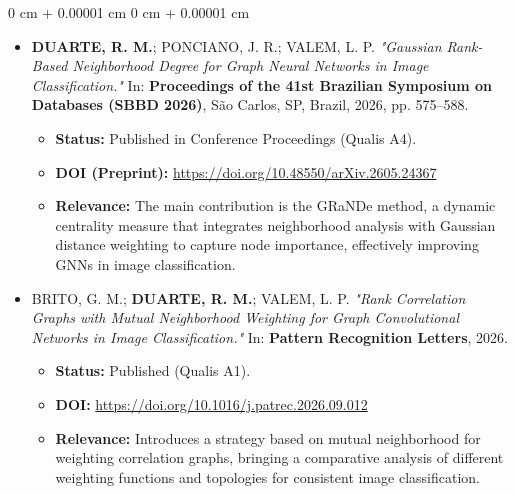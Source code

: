 \documentclass[10pt, letterpaper]{article}
\newenvironment{highlightsforbulletentries}{
    \begin{itemize}[
        topsep=0.10 cm,
        parsep=0.10 cm,
        partopsep=0pt,
        itemsep=0pt,
        leftmargin=10pt
    ]
}{
    \end{itemize}
} %
\newenvironment{onecolentry}{
    \begin{adjustwidth}{
        0 cm + 0.00001 cm
    }{
        0 cm + 0.00001 cm
    }
}{
    \end{adjustwidth}
} %
\begin{document}
\begin{onecolentry}
    \begin{highlightsforbulletentries}
    \item \textbf{DUARTE, R. M.}; PONCIANO, J. R.; VALEM, L. P. \textit{"Gaussian Rank-Based Neighborhood Degree for Graph Neural Networks in Image Classification."} In: \textbf{Proceedings of the 41st Brazilian Symposium on Databases (SBBD 2026)}, São Carlos, SP, Brazil, 2026, pp. 575--588.
    \begin{itemize}[topsep=0.05cm, parsep=0.05cm, leftmargin=0.5cm, label={--}]
        \item \textbf{Status:} Published in Conference Proceedings (Qualis A4).
        \item \textbf{DOI (Preprint):} \url{https://doi.org/10.48550/arXiv.2605.24367}
        \item \textbf{Relevance:} The main contribution is the GRaNDe method, a dynamic centrality measure that integrates neighborhood analysis with Gaussian distance weighting to capture node importance, effectively improving GNNs in image classification.
    \end{itemize}

    \vspace{0.15cm}

    \item BRITO, G. M.; \textbf{DUARTE, R. M.}; VALEM, L. P. \textit{"Rank Correlation Graphs with Mutual Neighborhood Weighting for Graph Convolutional Networks in Image Classification."} In: \textbf{Pattern Recognition Letters}, 2026.
    \begin{itemize}[topsep=0.05cm, parsep=0.05cm, leftmargin=0.5cm, label={--}]
        \item \textbf{Status:} Published (Qualis A1).
        \item \textbf{DOI:} \url{https://doi.org/10.1016/j.patrec.2026.09.012}
        \item \textbf{Relevance:} Introduces a strategy based on mutual neighborhood for weighting correlation graphs, bringing a comparative analysis of different weighting functions and topologies for consistent image classification.
    \end{itemize}

    \vspace{0.15cm}


\end{highlightsforbulletentries}
\end{onecolentry}
\end{document}
